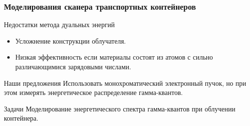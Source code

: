 \begin{frame}
\frametitle{Моделирования сканера транспортных контейнеров}
\begin{block}{Недостатки метода дуальных энергий}%
	\begin{itemize}
		\item Усложнение конструкции облучателя.
		\item Низкая эффективность если материалы состоят из атомов с сильно различающимися зарядовыми числами.
	\end{itemize}
\end{block}
\begin{block}{Наши предложения}%
	Использовать монохроматический электронный пучок, но при этом измерять энергетическое распределение гамма-квантов.
\end{block}
\begin{block}{Задачи}%
	Моделирование энергетического спектра гамма-квантов при облучении контейнера.
\end{block}
\end{frame}

%
%
%


